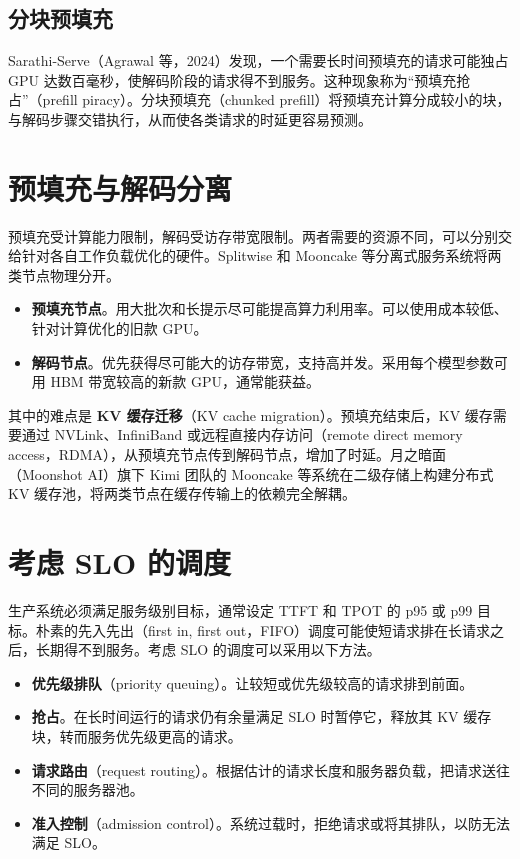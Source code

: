 \subsection{分块预填充}

Sarathi-Serve（Agrawal 等，2024）发现，一个需要长时间预填充的请求可能独占 GPU 达数百毫秒，使解码阶段的请求得不到服务。这种现象称为“预填充抢占”（prefill piracy）。分块预填充（chunked prefill）将预填充计算分成较小的块，与解码步骤交错执行，从而使各类请求的时延更容易预测。

\section{预填充与解码分离}

预填充受计算能力限制，解码受访存带宽限制。两者需要的资源不同，可以分别交给针对各自工作负载优化的硬件。Splitwise 和 Mooncake 等分离式服务系统将两类节点物理分开。
\begin{itemize}
  \item \textbf{预填充节点}。用大批次和长提示尽可能提高算力利用率。可以使用成本较低、针对计算优化的旧款 GPU。
  \item \textbf{解码节点}。优先获得尽可能大的访存带宽，支持高并发。采用每个模型参数可用 HBM 带宽较高的新款 GPU，通常能获益。
\end{itemize}

其中的难点是 \textbf{KV 缓存迁移}（KV cache migration）。预填充结束后，KV 缓存需要通过 NVLink、InfiniBand 或远程直接内存访问（remote direct memory access，RDMA），从预填充节点传到解码节点，增加了时延。月之暗面（Moonshot AI）旗下 Kimi 团队的 Mooncake 等系统在二级存储上构建分布式 KV 缓存池，将两类节点在缓存传输上的依赖完全解耦。

\section{考虑 SLO 的调度}

生产系统必须满足服务级别目标，通常设定 TTFT 和 TPOT 的 p95 或 p99 目标。朴素的先入先出（first in, first out，FIFO）调度可能使短请求排在长请求之后，长期得不到服务。考虑 SLO 的调度可以采用以下方法。
\begin{itemize}
  \item \textbf{优先级排队}（priority queuing）。让较短或优先级较高的请求排到前面。
  \item \textbf{抢占}。在长时间运行的请求仍有余量满足 SLO 时暂停它，释放其 KV 缓存块，转而服务优先级更高的请求。
  \item \textbf{请求路由}（request routing）。根据估计的请求长度和服务器负载，把请求送往不同的服务器池。
  \item \textbf{准入控制}（admission control）。系统过载时，拒绝请求或将其排队，以防无法满足 SLO。
\end{itemize}

